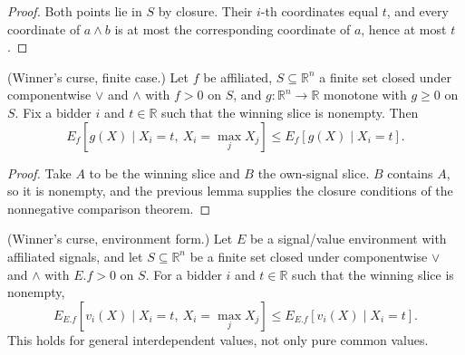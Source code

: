 \begin{proof}
\leanok
Both points lie in $S$ by closure. Their $i$-th coordinates equal $t$, and every coordinate of $a \wedge b$ is at most the corresponding coordinate of $a$, hence at most $t$.
\end{proof}

\begin{theorem}\label{thm:MathEconLib.Auction.Affiliation.condExpWinningSlice_le_condExpSlice_of_affiliated}
\leanok
{}
(Winner's curse, finite case.) Let $f$ be affiliated, $S \subseteq \mathbb{R}^n$ a finite set closed under componentwise $\vee$ and $\wedge$ with $f > 0$ on $S$, and $g : \mathbb{R}^n \to \mathbb{R}$ monotone with $g \ge 0$ on $S$. Fix a bidder $i$ and $t \in \mathbb{R}$ such that the winning slice is nonempty. Then
\[
  E_f[g(X) \mid X_i = t,\ X_i = \max_j X_j] \le E_f[g(X) \mid X_i = t].
\]
\end{theorem}

\begin{proof}
\leanok
{}
Take $A$ to be the winning slice and $B$ the own-signal slice. $B$ contains $A$, so it is nonempty, and the previous lemma supplies the closure conditions of the nonnegative comparison theorem.
\end{proof}

\begin{theorem}\label{thm:MathEconLib.Auction.Affiliation.SignalValueEnv.condExpWinningSlice_le_condExpSlice}
\leanok
{}
(Winner's curse, environment form.) Let $E$ be a signal/value environment with affiliated signals, and let $S \subseteq \mathbb{R}^n$ be a finite set closed under componentwise $\vee$ and $\wedge$ with $E.f > 0$ on $S$. For a bidder $i$ and $t \in \mathbb{R}$ such that the winning slice is nonempty,
\[
  E_{E.f}[v_i(X) \mid X_i = t,\ X_i = \max_j X_j] \le E_{E.f}[v_i(X) \mid X_i = t].
\]
This holds for general interdependent values, not only pure common values.
\end{theorem}

